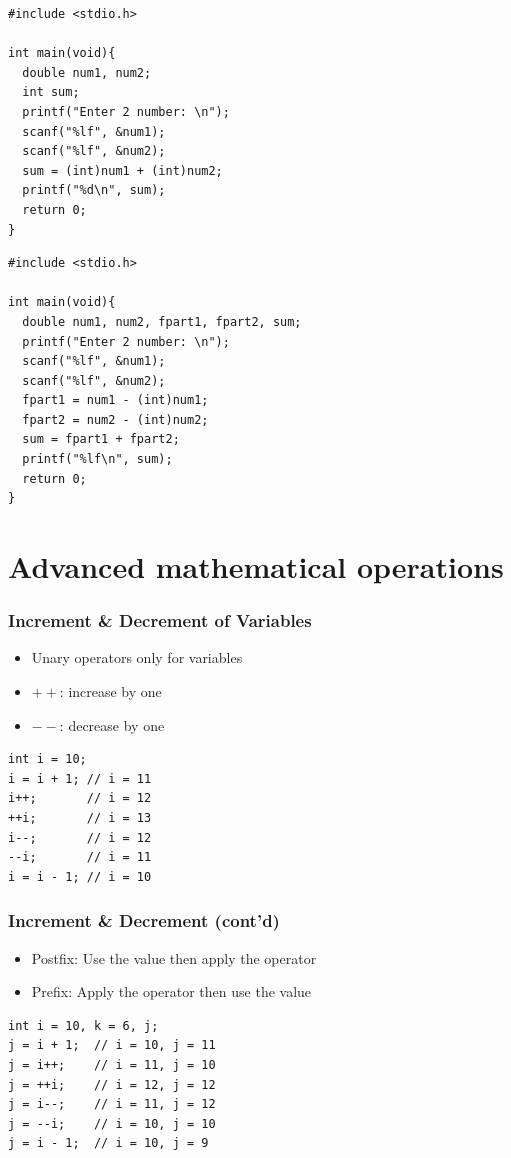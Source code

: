 \documentclass{../c-lecture}
\begin{document}
\begin{frame}[fragile]
  \begin{verbatim}
#include <stdio.h>

int main(void){
  double num1, num2;
  int sum;
  printf("Enter 2 number: \n");
  scanf("%lf", &num1);
  scanf("%lf", &num2);
  sum = (int)num1 + (int)num2;
  printf("%d\n", sum);
  return 0;
}
  \end{verbatim}
\end{frame}

\begin{frame}[fragile]
  \begin{verbatim}
#include <stdio.h>

int main(void){
  double num1, num2, fpart1, fpart2, sum;
  printf("Enter 2 number: \n");
  scanf("%lf", &num1);
  scanf("%lf", &num2);
  fpart1 = num1 - (int)num1;
  fpart2 = num2 - (int)num2;
  sum = fpart1 + fpart2;
  printf("%lf\n", sum);
  return 0;
}
  \end{verbatim}
\end{frame}

\section{Advanced mathematical operations}

\begin{frame}[fragile]
  \frametitle{Increment \& Decrement of Variables}
  \begin{itemize}
    \item Unary operators only for variables
    \item $++$: increase by one
    \item $--$: decrease by one
  \end{itemize}
  \begin{verbatim}
int i = 10;
i = i + 1; // i = 11
i++;       // i = 12
++i;       // i = 13
i--;       // i = 12
--i;       // i = 11
i = i - 1; // i = 10
  \end{verbatim}
\end{frame}

\begin{frame}[fragile]
  \frametitle{Increment \& Decrement (cont’d)}
  \begin{itemize}
    \item
      {\color{Cyan} Postfix:} Use the value then apply the
      operator
    \item
      {\color{Cyan} Prefix:} Apply the operator then use the value
  \end{itemize}
  \begin{verbatim}
int i = 10, k = 6, j;
j = i + 1;  // i = 10, j = 11
j = i++;    // i = 11, j = 10
j = ++i;    // i = 12, j = 12
j = i--;    // i = 11, j = 12
j = --i;    // i = 10, j = 10
j = i - 1;  // i = 10, j = 9
  \end{verbatim}
\end{frame}
\end{document}
